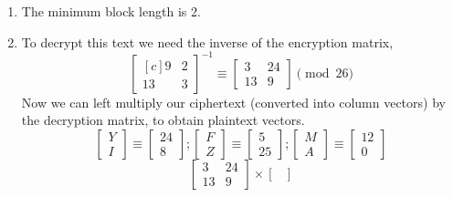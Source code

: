 \documentclass[12pt,letterpaper]{article}
\begin{document}
\pagestyle{fancy}
\rhead{\today}

\begin{enumerate}

    \item The minimum block length is 2.

    \item To decrypt this text we need the inverse of the encryption matrix, 
        $$\begin{bmatrix*}[c]
            9  & 2 \\
            13 & 3
        \end{bmatrix*}^{-1}
          \equiv
          \begin{bmatrix*}
             3 & 24 \\
            13 &  9
          \end{bmatrix*}
          \pmod {26}
        $$
        Now we can left multiply our ciphertext (converted into column vectors) by the decryption matrix, to obtain plaintext vectors.
        $$\begin{bmatrix*}
            Y\\I
          \end{bmatrix*}
          \equiv
          \begin{bmatrix*}
            24\\8
          \end{bmatrix*}
          ;
          \begin{bmatrix*}
            F\\Z
          \end{bmatrix*}
          \equiv
          \begin{bmatrix*}
            5\\25
          \end{bmatrix*}
          ;
          \begin{bmatrix*}
            M\\A
          \end{bmatrix*}
          \equiv
          \begin{bmatrix*}
            12\\0
          \end{bmatrix*}
        $$
        $$
          \begin{bmatrix*}
             3 & 24 \\
            13 &  9
          \end{bmatrix*}
          \times
          \begin{bmatrix*}

\end{bmatrix*}$$
\end{enumerate}
\end{document}

